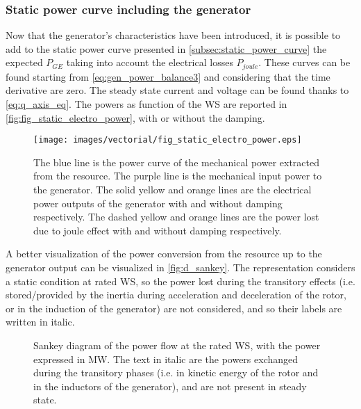  \subsubsection{Static power curve including the generator}\label{subsec:genertaor_power_curve}
 Now that the generator's characteristics have been introduced, it is possible to add to the static power curve presented in \autoref{subsec:static_power_curve} the expected $P_{GE}$ taking into account the electrical losses $P_{joule}$. These curves can be found starting from \autoref{eq:gen_power_balance3} and considering that the time derivative are zero. The steady state current and voltage can be found thanks to \autoref{eq:q_axis_eq}. The powers as function of the \acrshort{WS} are reported in \autoref{fig:fig_static_electro_power}, with or without the damping.
\begin{figure}[htb]
  \centering
  \texttt{[image: images/vectorial/fig\_static\_electro\_power.eps]}
\caption{The blue line is the power curve of the mechanical power extracted from the resource. The purple line is the mechanical input power to the generator. The solid yellow and orange lines are the electrical power outputs of the generator with and without damping respectively. The dashed yellow and orange lines are the power lost due to joule effect with and without damping respectively. }
  \label{fig:fig_static_electro_power}
\end{figure}

A better visualization of the power conversion from the resource up to the generator output can be visualized in \autoref{fig:d_sankey}. The representation considers a static condition at rated \acrshort{WS}, so the power lost during the transitory effects (i.e. stored/provided by the inertia during acceleration and deceleration of the rotor, or in the induction of the generator) are not considered, and so their labels are written in italic. 
\begin{figure}[htb]
  \centering
  
  \caption{Sankey diagram of the power flow at the rated WS, with the power expressed in MW. The text in italic are the powers exchanged during the transitory phases (i.e. in kinetic energy of the rotor and in the inductors of the generator), and are not present in steady state.}
  \label{fig:d_sankey}
\end{figure}

 
